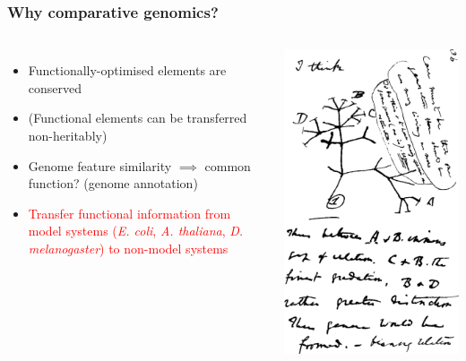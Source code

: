 %
\begin{frame}
  \frametitle{Why comparative genomics?}
    \begin{columns}[c] 
        \begin{itemize}
         \item \textcolor{hutton_purple}{Functionally-optimised elements are conserved}
         \item \textcolor{hutton_blue}{(Functional elements can be transferred non-heritably)}   
         \item \textcolor{RawSienna}{Genome feature similarity $\implies$ common function? (genome annotation)}
         \item \textcolor{red}{Transfer functional information from model systems (\textit{E. coli}, \textit{A. thaliana}, \textit{D. melanogaster}) to non-model systems}
        \end{itemize}
        \includegraphics[width=\textwidth]{images/darwin_tree}
    \end{columns}  
\end{frame}


